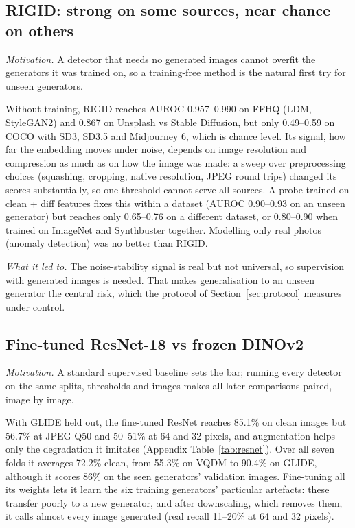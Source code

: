 \documentclass[10pt,a4paper]{article}
\newcommand{\why}[1]{\noindent\textit{\color{ntublue}Motivation.} #1\par}
\newcommand{\ledto}[1]{\par\noindent\textit{\color{ntublue}What it led to.} #1\par}
\begin{document}
\subsection{RIGID: strong on some sources, near chance on others}\label{sec:res-rigid}
\why{A detector that needs no generated images cannot overfit the generators it was trained on, so a training-free method is the natural first try for unseen generators.}
Without training, RIGID reaches AUROC 0.957--0.990 on FFHQ (LDM, StyleGAN2) and 0.867 on Unsplash vs Stable Diffusion, but only 0.49--0.59 on COCO with SD3, SD3.5 and Midjourney 6, which is chance level. Its signal, how far the embedding moves under noise, depends on image resolution and compression as much as on how the image was made: a sweep over preprocessing choices (squashing, cropping, native resolution, JPEG round trips) changed its scores substantially, so one threshold cannot serve all sources. A probe trained on clean + diff features fixes this within a dataset (AUROC 0.90--0.93 on an unseen generator) but reaches only 0.65--0.76 on a different dataset, or 0.80--0.90 when trained on ImageNet and Synthbuster together. Modelling only real photos (anomaly detection) was no better than RIGID.
\ledto{The noise-stability signal is real but not universal, so supervision with generated images is needed. That makes generalisation to an unseen generator the central risk, which the protocol of Section~\ref{sec:protocol} measures under control.}

\subsection{Fine-tuned ResNet-18 vs frozen DINOv2}\label{sec:res-baselines}
\why{A standard supervised baseline sets the bar; running every detector on the same splits, thresholds and images makes all later comparisons paired, image by image.}
With GLIDE held out, the fine-tuned ResNet reaches 85.1\% on clean images but 56.7\% at JPEG Q50 and 50--51\% at 64 and 32 pixels, and augmentation helps only the degradation it imitates (Appendix Table~\ref{tab:resnet}). Over all seven folds it averages 72.2\% clean, from 55.3\% on VQDM to 90.4\% on GLIDE, although it scores 86\% on the seen generators' validation images. Fine-tuning all its weights lets it learn the six training generators' particular artefacts: these transfer poorly to a new generator, and after downscaling, which removes them, it calls almost every image generated (real recall 11--20\% at 64 and 32 pixels).
\end{document}

